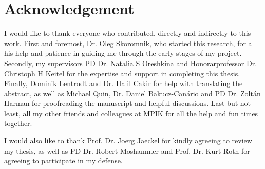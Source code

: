\chapter*{Acknowledgement}

I would like to thank everyone who contributed, directly and indirectly to this work. First and foremost, Dr. Oleg Skoromnik, who started this research, for all his help and patience in guiding me through the early stages of my project. Secondly, my supervisors PD Dr. Natalia S Oreshkina and Honorarprofessor Dr. Christoph H Keitel for the expertise and support in completing this thesis. Finally, Dominik Lentrodt and Dr. Halil Cakir for help with translating the abstract, as well as Michael Quin, Dr. Daniel Bakucz-Can\'ario and PD Dr. Zolt\'an Harman for proofreading the manuscript and helpful discussions. Last but not least, all my other friends and colleagues at MPIK for all the help and fun times together.

I would also like to thank Prof. Dr. Joerg Jaeckel for kindly agreeing to review my thesis, as well as PD Dr. Robert Moshammer and Prof. Dr. Kurt Roth for agreeing to participate in my defense.